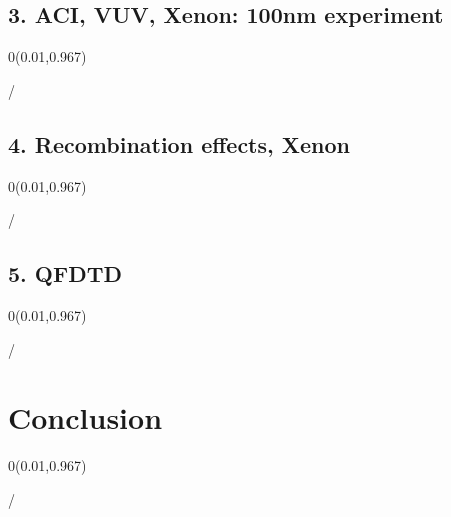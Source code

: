 \documentclass{beamer}
\makeatletter
\newcommand{\framenumber}{
\begin{textblock}{0}(0.01,0.967)
\begin{scriptsize}
{\color{gray}\insertframenumber/\inserttotalframenumber}
\end{scriptsize}
\end{textblock}
}
\makeatother
\begin{document}
\subsection{3. ACI, VUV, Xenon: 100nm experiment}
\begin{frame}{}\framenumber
\end{frame}

\subsection{4. Recombination effects, Xenon}
\begin{frame}{}\framenumber
\end{frame}

\subsection{5. QFDTD}
\begin{frame}{}\framenumber
\end{frame}


\section{Conclusion}

\begin{frame}{}\framenumber
\end{frame}
\end{document}

